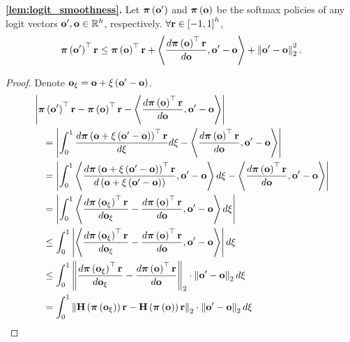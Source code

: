 {\bf \cref{lem:logit_smoothness}.} Let ${\boldsymbol{\pi}}\left( {\mathbf{o}}^\prime \right)$ and ${\boldsymbol{\pi}}\left( {\mathbf{o}} \right)$ be the softmax policies of any logit vectors ${\mathbf{o}}^\prime, {\mathbf{o}} \in {\mathbb{R}}^h$, respectively. $\forall {\mathbf{r}} \in \left[ -1, 1\right]^h$,
\begin{equation*}
    {\boldsymbol{\pi}}\left( {\mathbf{o}}^\prime \right)^\top {\mathbf{r}} \le {\boldsymbol{\pi}}\left( {\mathbf{o}} \right)^\top {\mathbf{r}} + \left\langle \frac{d {\boldsymbol{\pi}}\left( {\mathbf{o}} \right)^\top {\mathbf{r}}}{d {\mathbf{o}}}, {\mathbf{o}}^\prime - {\mathbf{o}} \right\rangle + \left\| {\mathbf{o}}^\prime - {\mathbf{o}} \right\|_2^2.
\end{equation*}
\begin{proof}
Denote ${\mathbf{o}}_{\xi} = {\mathbf{o}} + \xi \left( {\mathbf{o}}^\prime - {\mathbf{o}} \right)$.
\begin{equation*}
\begin{split}
    &\left| \rvpi\left( \rvo^\prime \right)^\top \rvr - \rvpi\left( \rvo \right)^\top \rvr - \left\langle \frac{d \rvpi\left( \rvo \right)^\top \rvr}{d \rvo}, \rvo^\prime - \rvo \right\rangle \right| \\
    &\quad = \left| \int_0^1{ \frac{d \rvpi\left( \rvo + \xi \left( \rvo^\prime - \rvo \right) \right)^\top \rvr}{d \xi} d\xi} - \left\langle \frac{d \rvpi\left( \rvo \right)^\top \rvr}{d \rvo}, \rvo^\prime - \rvo \right\rangle \right| \\
    &\quad = \left| \int_0^1{ \left\langle \frac{d \rvpi\left( \rvo + \xi \left( \rvo^\prime - \rvo \right) \right)^\top \rvr}{d \left( \rvo + \xi \left( \rvo^\prime - \rvo \right) \right)}, \rvo^\prime - \rvo \right\rangle d\xi} - \left\langle \frac{d \rvpi\left( \rvo \right)^\top \rvr}{d \rvo}, \rvo^\prime - \rvo \right\rangle \right| \\
    &\quad = \left| \int_0^1{ \left\langle \frac{d \rvpi\left( \rvo_{\xi} \right)^\top \rvr}{d \rvo_{\xi}} - \frac{d \rvpi\left( \rvo \right)^\top \rvr}{d \rvo}, \rvo^\prime - \rvo \right\rangle d\xi} \right| \\
    &\quad \le \int_0^1{ \left| \left\langle \frac{d \rvpi\left( \rvo_{\xi} \right)^\top \rvr}{d \rvo_{\xi}} - \frac{d \rvpi\left( \rvo \right)^\top \rvr}{d \rvo}, \rvo^\prime - \rvo \right\rangle \right| d\xi} \\
    &\quad \le \int_0^1{ \left\| \frac{d \rvpi\left( \rvo_{\xi} \right)^\top \rvr}{d \rvo_{\xi}} - \frac{d \rvpi\left( \rvo \right)^\top \rvr}{d \rvo} \right\|_2 \cdot \left\| \rvo^\prime - \rvo \right\|_2 d\xi} \\
    &\quad = \int_0^1{ \left\| \rmH\left( \rvpi\left( \rvo_{\xi} \right)\right) \rvr - \rmH\left( \rvpi\left( \rvo \right)\right) \rvr \right\|_2 \cdot \left\| \rvo^\prime - \rvo \right\|_2 d\xi} \\

\end{split}
\end{equation*}
\end{proof}
